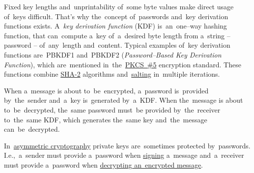 \label{keypassword}
Fixed key lengths and~unprintability of~some byte values make direct usage of~keys difficult.
That's why the~concept of~passwords and~key derivation functions exists.
A~\textit{key derivation function} (KDF) is~an~one--way hashing function, that can~compute a~key of~a~desired byte length from a~string -- password -- of~any~length and~content.
Typical examples of~key derivation functions are~PBKDF1 and~PBKDF2 (\textit{Password--Based Key Derivation Function}), which are~mentioned in~the~\hyperref[pkcs]{PKCS~\#5} encryption standard.
These functions combine \hyperref[sha]{SHA-2} algorithms and~\hyperref[salt]{salting} in~multiple iterations.

When a~message is about to~be~encrypted, a~password is~provided by~the~sender and~a~key is~generated by~a~KDF\@.
When the~message is about to~be~decrypted, the~same password must~be provided by~the~receiver to~the~same KDF, which generates the~same key and~the~message can~be~decrypted.

In~\hyperref[asymmetriccryptography]{asymmetric cryptography} private keys are~sometimes protected by~passwords.
I.e.,~a~sender must provide a~password when \hyperref[electronicsignature]{signing} a~message and~a~receiver must provide a~password when \hyperref[asymmetriccryptography]{decrypting an~encrypted message}.

